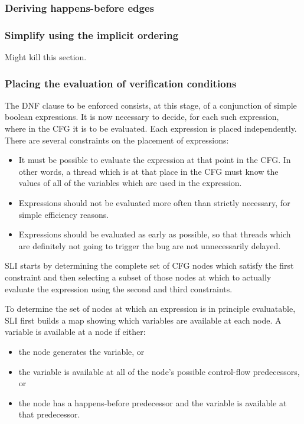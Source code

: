 \subsubsection{Deriving happens-before edges}

\subsubsection{Simplify using the implicit ordering}
Might kill this section.

\subsubsection{Placing the evaluation of verification conditions}
The DNF clause to be enforced consists, at this stage, of a conjunction of simple boolean expressions.
It is now necessary to decide, for each such expression, where in the CFG it is to be evaluated.
Each expression is placed independently.
There are several constraints on the placement of expressions:

\begin{itemize}
\item
  It must be possible to evaluate the expression at that point in the CFG.
  In other words, a thread which is at that place in the CFG must know the values of all of the variables which are used in the expression.
\item
  Expressions should not be evaluated more often than strictly necessary, for simple efficiency reasons.
\item
  Expressions should be evaluated as early as possible, so that threads which are definitely not going to trigger the bug are not unnecessarily delayed.
\end{itemize}

SLI starts by determining the complete set of CFG nodes which satisfy the first constraint and then selecting a subset of those nodes at which to actually evaluate the expression using the second and third constraints.

To determine the set of nodes at which an expression is in principle evaluatable, SLI first builds a map showing which variables are available at each node.
A variable is available at a node if either:

\begin{itemize}
\item
  the node generates the variable, or
\item
  the variable is available at all of the node's possible control-flow predecessors, or
\item
  the node has a happens-before predecessor and the variable is available at that predecessor.
\end{itemize}

